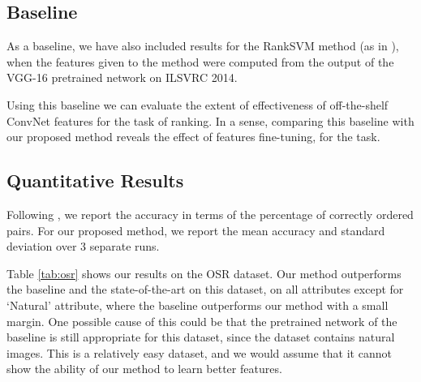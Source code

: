 \subsection{Baseline}

As a baseline, we have also included results for the RankSVM method (as in \cite{parikh2011}), when the features given to the method were computed from the output of the VGG-16 pretrained network on ILSVRC 2014. 

Using this baseline we can evaluate the extent of effectiveness of off-the-shelf ConvNet features \cite{offtheshelf}  for the task of ranking. In a sense, comparing this baseline with our proposed method reveals the effect of features fine-tuning, for the task. 

\subsection{Quantitative Results}

Following \cite{parikh2011,Yu2014,Sandeep_2014_CVPR}, we report the accuracy in terms of the percentage of correctly ordered pairs. For our proposed method, we report the mean accuracy and standard deviation over 3 separate runs. 

Table \ref{tab:osr} shows our results on the OSR dataset. Our method outperforms the baseline and the state-of-the-art on this dataset, on all attributes except for `Natural' attribute, where the baseline outperforms our method with a small margin. One possible cause of this could be that the pretrained network of the baseline is still appropriate for this dataset, since the dataset contains natural images. This is a relatively easy dataset, and we would assume that it cannot show the ability of our method to learn better features.

